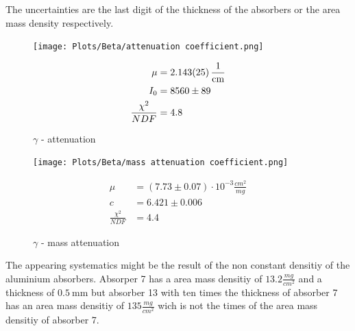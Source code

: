 \documentclass[12pt,twoside,a4paper]{scrartcl}
\begin{document}
        The uncertainties are the last digit of the thickness of the absorbers
        or the area mass density respectively.

        \begin{figure}[H]
					\centering
                \begin{minipage}{0.69 \textwidth}
                    \texttt{[image: Plots/Beta/attenuation coefficient.png]}
                \end{minipage}
                \begin{minipage}{0.29 \textwidth}
                    \begin{align*}
                        \mu &= \SI{2.143 \pm 0.025}{\frac{1}{\centi\metre}} \\
                        I_0 &= 8560 \pm 89 \\
                        \frac{\chi^2}{NDF} &= 4.8
                    \end{align*}
                \end{minipage}
                \caption{$\gamma$ - attenuation}
            \end{figure}

        \begin{figure}[H]
					\centering
                \begin{minipage}{0.69 \textwidth}
                    \texttt{[image: Plots/Beta/mass attenuation coefficient.png]}
                \end{minipage}
                \begin{minipage}{0.29 \textwidth}
                    \begin{align*}
                        \mu &= (7.73 \pm 0.07) \cdot 10^{-3} \frac{cm^2}{mg}\\
                        c &= 6.421 \pm 0.006 \\
                        \frac{\chi^2}{NDF} &= 4.4
                    \end{align*}
                \end{minipage}
                \caption{$\gamma$ - mass attenuation}
            \end{figure}

        The appearing systematics might be the result of the non constant densitiy of
        the aluminium absorbers. Absorper 7 has a area mass densitiy of $13.2 \frac{mg}{cm^2}$
        and a thickness of $\SI{0.5}{\milli \metre}$ but absorber 13 with ten times the thickness
        of absorber 7 has an area mass densitiy of $135 \frac{mg}{cm^2}$ wich is not
        the times of the area mass densitiy of absorber 7.
\end{document}
